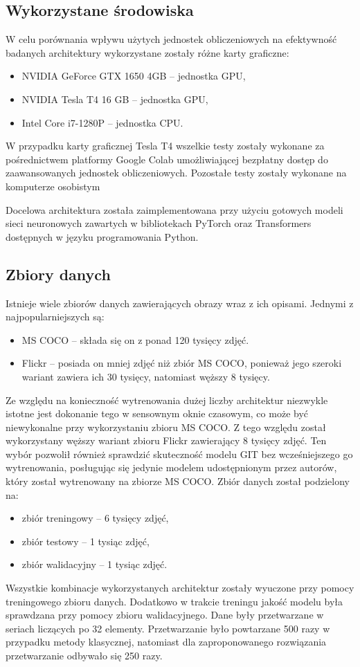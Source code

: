 \subsection{Wykorzystane środowiska}
W celu porównania wpływu użytych jednostek obliczeniowych na efektywność badanych architektury wykorzystane zostały różne karty graficzne:
\begin{itemize}
    \item NVIDIA GeForce GTX 1650 4GB -- jednostka GPU,
    \item NVIDIA Tesla T4 16 GB -- jednostka GPU,
    \item Intel Core i7-1280P -- jednostka CPU.
\end{itemize}
W przypadku karty graficznej Tesla T4 wszelkie testy zostały wykonane za pośrednictwem platformy Google Colab umożliwiającej bezpłatny dostęp do zaawansowanych jednostek obliczeniowych. Pozostałe testy zostały wykonane na komputerze osobistym

Docelowa architektura została zaimplementowana przy użyciu gotowych modeli sieci neuronowych zawartych w bibliotekach PyTorch \cite{pytorch} oraz Transformers \cite{wolf-etal-2020-transformers} dostępnych w języku programowania Python.
\subsection{Zbiory danych}
Istnieje wiele zbiorów danych zawierających obrazy wraz z ich opisami. Jednymi z najpopularniejszych są:
\begin{itemize}
    \item MS COCO \cite{mscoco} -- składa się on z ponad 120 tysięcy zdjęć.
    \item Flickr \cite{flickr30k} -- posiada on mniej zdjęć niż zbiór MS COCO, ponieważ jego szeroki wariant zawiera ich 30 tysięcy, natomiast węższy 8 tysięcy.
\end{itemize}
Ze względu na konieczność wytrenowania dużej liczby architektur niezwykle istotne jest dokonanie tego w sensownym oknie czasowym, co może być niewykonalne przy wykorzystaniu zbioru MS COCO. Z tego względu został wykorzystany węższy wariant zbioru Flickr zawierający 8 tysięcy zdjęć. Ten wybór pozwolił również sprawdzić skuteczność modelu GIT bez wcześniejszego go wytrenowania, posługując się jedynie modelem udostępnionym przez autorów, który został wytrenowany na zbiorze MS COCO.
Zbiór danych został podzielony na:
\begin{itemize}
    \item zbiór treningowy -- 6 tysięcy zdjęć,
    \item zbiór testowy -- 1 tysiąc zdjęć,
    \item zbiór walidacyjny -- 1 tysiąc zdjęć.
\end{itemize}

\noindent Wszystkie kombinacje wykorzystanych architektur zostały wyuczone przy pomocy treningowego zbioru danych. Dodatkowo w trakcie treningu jakość modelu była sprawdzana przy pomocy zbioru walidacyjnego. Dane były przetwarzane w seriach liczących po 32 elementy. Przetwarzanie było powtarzane 500 razy w przypadku metody klasycznej, natomiast dla zaproponowanego rozwiązania przetwarzanie odbywało się 250 razy.

